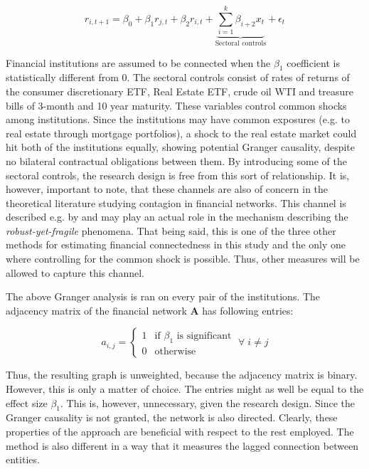\documentclass[12pt]{article}
\begin{document}
\begin{equation}\label{equation:granger_used}
	r_{i,t+1} = \beta_0 + \beta_1 r_{j,t} + \beta_2 r_{i, t} + \underbrace{\sum_{i=1}^{k} \beta_{i+2} x_{t}}_{\text{Sectoral controls}} + \epsilon_t
\end{equation}

Financial institutions are assumed to be connected when the $\beta_1$ coefficient is statistically different from 0. The sectoral controls consist of rates of returns of the consumer discretionary ETF, Real Estate ETF, crude oil WTI and treasure bills of 3-month and 10 year maturity. These variables control common shocks among institutions. Since the institutions may have common exposures (e.g. to real estate through mortgage portfolios), a shock to the real estate market could hit both of the institutions equally, showing potential Granger causality, despite no bilateral contractual obligations between them. By introducing some of the sectoral controls, the research design is free from this sort of relationship. It is, however, important to note, that these channels are also of concern in the theoretical literature studying contagion in financial networks. This channel is described e.g. by \cite{cifuentes05} and may play an actual role in the mechanism describing the \textit{robust-yet-fragile} phenomena. That being said, this is one of the three other methods for estimating financial connectedness in this study and the only one where controlling for the common shock is possible. Thus, other measures will be allowed to capture this channel. 

The above Granger analysis is ran on every pair of the institutions. The adjacency matrix of the financial network $\boldsymbol{A}$ has following entries:

\begin{equation}
	a_{i,j} = \begin{cases}
		1  & \text{if } \beta_1 \text{ is significant} \\
		0 & \text{otherwise}
	\end{cases} \; \forall \; i \neq j
\end{equation}

Thus, the resulting graph is unweighted, because the adjacency matrix is binary. However, this is only a matter of choice. The entries might as well be equal to the effect size $\beta_1$. This is, however, unnecessary, given the research design. Since the Granger causality is not granted, the network is also directed. Clearly, these properties of the approach are beneficial with respect to the rest employed. The method is also different in a way that it measures the lagged connection between entities. 
\end{document}
